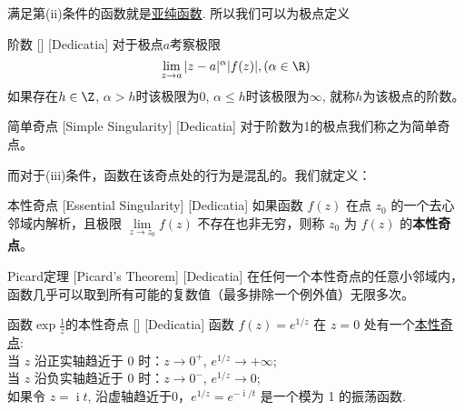 \documentclass[UTF8]{ctexart}
\DeclareMathOperator{\ii}{\mathrm{i}}
\newcommand{\MeromorphicFunction}{\hyperref[dfn:MeromorphicFunction]{亚纯函数}}
\newcommand{\EssentialSingularity}{\hyperref[dfn:EssentialSingularity]{本性奇点}}
\begin{document}
满足第(ii)条件的函数就是\MeromorphicFunction. 所以我们可以为极点定义
\begin{dfn}
    [UUID]
    {阶数}
    []
    [Dedicatia]
    对于极点$a$考察极限
    \[\lim_{z\to a}|z-a|^\alpha |f(z)|, (\alpha\in\R)\]
    如果存在$h\in\Z$, $\alpha>h$时该极限为0, $\alpha\leq h$时该极限为$\infty$, 就称$h$为该极点的阶数。
\end{dfn}
\begin{dfn}
    [UUID]
    {简单奇点}
    [Simple Singularity]
    [Dedicatia]
    对于阶数为1的极点我们称之为简单奇点。
\end{dfn}
而对于(iii)条件，函数在该奇点处的行为是混乱的。我们就定义：
\begin{dfn}
    [UUID]
    {本性奇点\label{dfn:EssentialSingularity}}
    [Essential Singularity]
    [Dedicatia]
    如果函数 \( f(z) \) 在点 \( z_0 \) 的一个去心邻域内解析，且极限 \( \lim\limits_{z \to z_0} f(z) \) 不存在也非无穷，则称 \( z_0 \) 为 \( f(z) \) 的\textbf{本性奇点}。
\end{dfn}
\begin{thm}
    [UUID]
    {Picard定理}
    [Picard's Theorem]
    [Dedicatia]
    在任何一个本性奇点的任意小邻域内，函数几乎可以取到所有可能的复数值（最多排除一个例外值）无限多次。
\end{thm}
\begin{xmp}
    [UUID]
    {函数$\exp\frac{1}{z}$的本性奇点}
    []
    [Dedicatia]
    函数 \( f(z) = e^{1/z} \) 在 \( z=0 \) 处有一个\EssentialSingularity :\\
    当 \( z \) 沿正实轴趋近于 0 时：\( z \to 0^+ \), \( e^{1/z} \to +\infty \);\\ 
    当 \( z \) 沿负实轴趋近于 0 时：\( z \to 0^- \), \( e^{1/z} \to 0 \);\\
    如果令 \( z =\ii t \), 沿虚轴趋近于0，\( e^{1/z} = e^{-\ii/t} \) 是一个模为 1 的振荡函数.
\end{xmp}
\end{document}

